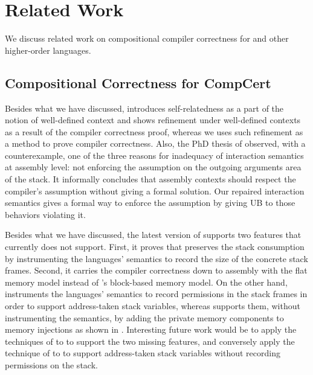 \section{Related Work}
\label{sec:compiler:related}

We discuss related work on compositional compiler correctness for \cc{} and other higher-order languages.

\subsection{Compositional Correctness for CompCert}

\myparagraph{\ccc{}} Besides what we have discussed, \ccc{}
introduces self-relatedness as a part of the notion of well-defined
context and shows refinement under well-defined contexts as a result
of the compiler correctness proof, whereas we uses such refinement as
a method to prove compiler correctness.  Also, the PhD thesis of
\cite{StewartThesis} observed, with a counterexample, one of the
three reasons for inadequacy of interaction semantics at assembly
level: not enforcing the assumption on the outgoing arguments area of
the stack. It informally concludes that assembly contexts should
respect the compiler's assumption without giving a formal solution.
Our repaired interaction semantics gives a formal way to enforce the
assumption by giving UB to those behaviors violating it.  

\myparagraph{\ccx{}} Besides what we have discussed, the latest
version of \ccx{} \cite{wang:saccx} supports two features that \ccm{}
currently does not support. First, it proves that \ccx{} preserves the
stack consumption by instrumenting the languages' semantics to record
the size of the concrete stack frames. Second, it carries the compiler
correctness down to assembly with the flat memory model instead of
\cc{}'s block-based memory model. On the other hand, \ccx{} instruments the
languages' semantics to record permissions in the stack frames in
order to support address-taken stack variables, whereas \ccm{} supports
them, without instrumenting the semantics, by adding the private
memory components to memory injections as shown in
.
Interesting future work would be to apply the techniques of \ccx{} to \ccm{} to
support the two missing features, and conversely apply the technique of
\ccm{} to \ccx{} to support address-taken stack variables without
recording permissions on the stack.

